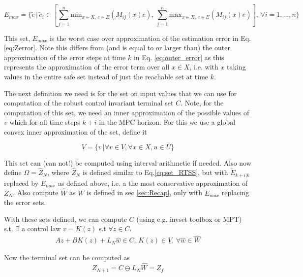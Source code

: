\documentclass{article}[14pt]
\begin{document}
\begin{equation}
E_{max} = \{\tilde{e}\,|\,\tilde{e}_i\in[\sum_{j=1}^n \text{min}_{x\in X,\,e\in E}(M_{ij}(x)e),\, \sum_{j=1}^n \text{max}_{x\in X,\,e\in E}(M_{ij}(x)e)],\,\forall i=1,\dotsc,n\}
\end{equation}

This set, $E_{max}$ is the worst case over approximation of the estimation error in Eq.\ref{eq:Zerror}. Note this differs from (and is equal to or larger than) the outer approximation of the error steps at time $k$ in Eq. \ref{eq:outer_error} as this represents the approximation of the error term over all $x\in X$, i.e. with $x$ taking values in the entire safe set instead of just the reachable set at time $k$.

The next definition we need is for the set on input values that we can use for computation of the robust control invariant terminal set $C$. Note, for the computation of this set, we need an inner approximation of the possible values of $v$ which for all time steps $k+i$ in the MPC horizon. For this we use a global convex inner approximation of the set, define it

\begin{equation}
\label{eq:V_inner}
\underline{V} = \{v\,|\forall v\in \underline{V},\forall x\in X, u\in U\}
\end{equation}

This set can (can not!) be computed using interval arithmetic if needed. Also now define $\Omega=\hat{Z}_N$, where $\hat{Z}_N$ is defined similar to Eq.\ref{eq:set_RTSS}, but with $\tilde{E}_{k+i|k}$ replaced by $E_{max}$ as defined above, i.e. a the most conservative approximation of $Z_N$. Also compute $\hat{W}$ as $\tilde{W}$ is defined in sec \ref{sec:Recap}, only with $E_{max}$ replacing the error sets.

With these sets defined, we can compute $C$ (using e.g. invset toolbox or MPT) s.t. $\exists$ a control law $v=K(z)$ s.t $\forall z \in C$.
\begin{subequations}
\begin{align}
Az+BK(z)+L_N\hat{w}\in C,\, K(z)\in \underline{V}, \,\forall \hat{w} \in \hat{W}
\end{align}
\end{subequations}

Now the terminal set can be computed as 
\begin{equation}
Z_{N+1}=C\ominus L_N\hat{W}=Z_f
\end{equation}
\end{document}
